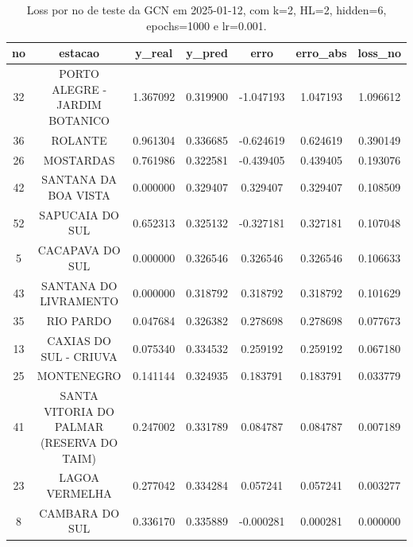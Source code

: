 \begin{table}[h]
\centering
\caption{Loss por no de teste da GCN em 2025-01-12, com k=2, HL=2, hidden=6, epochs=1000 e lr=0.001.}
\label{tab:gcn_loss_k2_hl2_h6_e1000_d20250112}
\begin{tabular}{ccccccc}
\toprule
no & estacao & y\_real & y\_pred & erro & erro\_abs & loss\_no \\
\midrule
32 & PORTO ALEGRE - JARDIM BOTANICO & 1.367092 & 0.319900 & -1.047193 & 1.047193 & 1.096612 \\
36 & ROLANTE & 0.961304 & 0.336685 & -0.624619 & 0.624619 & 0.390149 \\
26 & MOSTARDAS & 0.761986 & 0.322581 & -0.439405 & 0.439405 & 0.193076 \\
42 & SANTANA DA BOA VISTA & 0.000000 & 0.329407 & 0.329407 & 0.329407 & 0.108509 \\
52 & SAPUCAIA DO SUL & 0.652313 & 0.325132 & -0.327181 & 0.327181 & 0.107048 \\
5 & CACAPAVA DO SUL & 0.000000 & 0.326546 & 0.326546 & 0.326546 & 0.106633 \\
43 & SANTANA DO LIVRAMENTO & 0.000000 & 0.318792 & 0.318792 & 0.318792 & 0.101629 \\
35 & RIO PARDO & 0.047684 & 0.326382 & 0.278698 & 0.278698 & 0.077673 \\
13 & CAXIAS DO SUL - CRIUVA & 0.075340 & 0.334532 & 0.259192 & 0.259192 & 0.067180 \\
25 & MONTENEGRO & 0.141144 & 0.324935 & 0.183791 & 0.183791 & 0.033779 \\
41 & SANTA VITORIA DO PALMAR (RESERVA DO TAIM) & 0.247002 & 0.331789 & 0.084787 & 0.084787 & 0.007189 \\
23 & LAGOA VERMELHA & 0.277042 & 0.334284 & 0.057241 & 0.057241 & 0.003277 \\
8 & CAMBARA DO SUL & 0.336170 & 0.335889 & -0.000281 & 0.000281 & 0.000000 \\
\bottomrule
\end{tabular}
\end{table}
